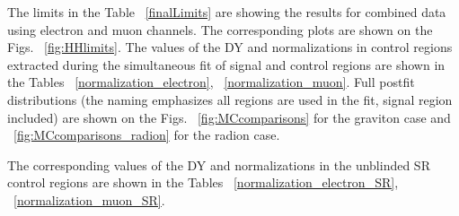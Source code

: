 The limits in the Table ~\ref{finalLimits} are showing the results for combined data using electron and muon channels. The corresponding plots are shown on the Figs. ~\ref{fig:HHlimits}. %
The values of the DY and \ttbar normalizations in control regions extracted during the simultaneous fit of signal and control regions are shown in the Tables ~\ref{normalization_electron}, ~\ref{normalization_muon}.%
Full postfit distributions (the naming emphasizes all regions are used in the fit, signal region included) are shown on the Figs. ~\ref{fig:MCcomparisons} for the graviton case and ~\ref{fig:MCcomparisons_radion} for the radion case. 


The corresponding values of the DY and \ttbar normalizations in the unblinded SR control regions are shown in the Tables ~\ref{normalization_electron_SR}, ~\ref{normalization_muon_SR}.









